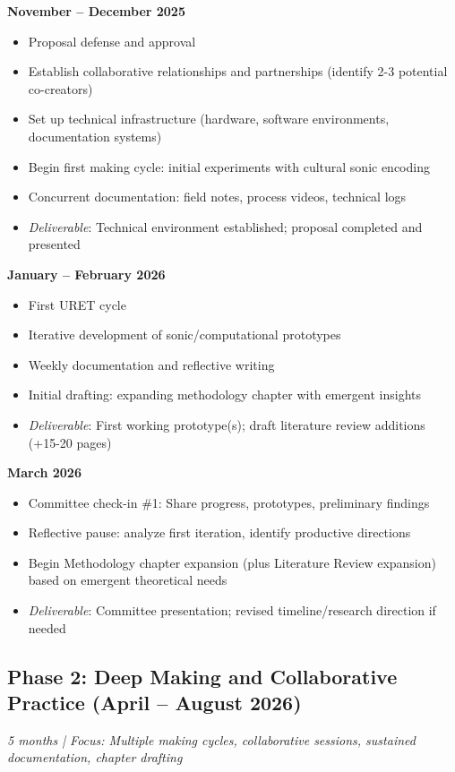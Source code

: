 \textbf{November – December 2025}
\begin{itemize}[noitemsep]
	\item Proposal defense and approval
	\item Establish collaborative relationships and partnerships (identify 2-3 potential co-creators)
	\item Set up technical infrastructure (hardware, software environments, documentation systems)
	\item Begin first making cycle: initial experiments with cultural sonic encoding
	\item Concurrent documentation: field notes, process videos, technical logs
	\item \textit{Deliverable}: Technical environment established; proposal completed and presented
\end{itemize}

\textbf{January – February 2026}
\begin{itemize}[noitemsep]
	\item First URET cycle
	\item Iterative development of sonic/computational prototypes
	\item Weekly documentation and reflective writing
	\item Initial drafting: expanding methodology chapter with emergent insights
	\item \textit{Deliverable}: First working prototype(s); draft literature review additions (+15-20 pages)
\end{itemize}

\textbf{March 2026}
\begin{itemize}[noitemsep]
	\item Committee check-in \#1: Share progress, prototypes, preliminary findings
	\item Reflective pause: analyze first iteration, identify productive directions
	\item Begin Methodology chapter expansion (plus Literature Review expansion) based on emergent theoretical needs
	\item \textit{Deliverable}: Committee presentation; revised timeline/research direction if needed
\end{itemize}

\subsection*{Phase 2: Deep Making and Collaborative Practice (April – August 2026)}
\textit{5 months | Focus: Multiple making cycles, collaborative sessions, sustained documentation, chapter drafting}

